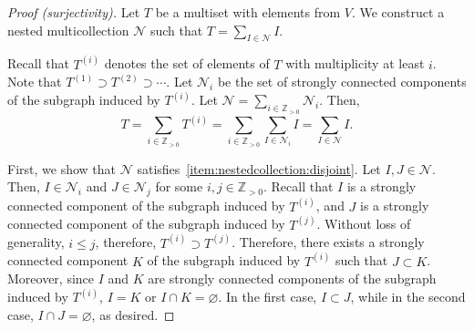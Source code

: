 \documentclass[11pt]{article}
\theoremstyle{definition}
\numberwithin{equation}{section}
\newcommand{\positiveintegers}{\mathbb{Z}_{>0}}
\newcommand{\mtp}[1]{^{(#1)}} \newcommand{\graph}{\varGamma}
\newcommand{\vertices}{V}
\begin{document}
\begin{proof}[Proof (surjectivity)]
    Let \(T\) be a multiset with elements from \(\vertices\).
    We construct a nested multicollection \(\mathcal{N}\) such that \(T = \sum_{I \in \mathcal{N}} I\).

    Recall that \(T\mtp{i}\) denotes the set of elements of \(T\) with multiplicity at least \(i\).
    Note that \(T\mtp{1} \supset T\mtp{2} \supset \cdots\).
    Let \(\mathcal{N}_i\) be the set of strongly connected components of the subgraph induced by \(T\mtp{i}\).
    Let \(\mathcal{N} = \sum_{i \in \positiveintegers} \mathcal{N}_i\).
    Then, 
    \begin{equation*}
		T = \sum_{i \in \positiveintegers} T\mtp{i} = \sum_{i \in \positiveintegers} \sum_{I \in \mathcal{N}_i} I = \sum_{I \in \mathcal{N}} I.
	\end{equation*}

    First, we show that \(\mathcal{N}\) satisfies~\ref{item:nestedcollection:disjoint}.
    Let \(I, J \in \mathcal{N}\).
    Then, \(I \in \mathcal{N}_i\) and \(J \in \mathcal{N}_j\) for some \(i, j \in \positiveintegers\).
    Recall that \(I\) is a strongly connected component of the subgraph induced by \(T\mtp{i}\), and \(J\) is a strongly connected component of the subgraph induced by \(T\mtp{j}\).
    Without loss of generality, \(i \leq j\), therefore, \(T\mtp{i} \supset T\mtp{j}\).
    Therefore, there exists a strongly connected component \(K\) of the subgraph induced by \(T\mtp{i}\) such that \(J \subset K\).
    Moreover, since \(I\) and \(K\) are strongly connected components of the subgraph induced by \(T\mtp{i}\), \(I = K\) or \(I \cap K = \varnothing\).
    In the first case, \(I \subset J\), 
    while in the second case, \(I \cap J = \varnothing\),
    as desired.


\end{proof}
\end{document}
